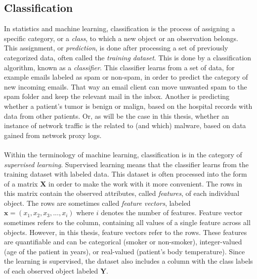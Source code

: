 \documentclass[11pt]{article}
\begin{document}
    \subsection{Classification}
      In statistics and machine learning, classification is the process of assigning a specific category, or a {\it class}, to which a new object or an observation belongs.\cite{elements} This assignment, or {\it prediction}, is done after processing a set of previously categorized data, often called the {\it training dataset}.\cite{elements} This is done by a classification algorithm, known as a {\it classifier}.\cite{elements} This classifier learns from a set of data, for example emails labeled as spam or non-spam, in order to predict the category of new incoming emails. That way an email client can move unwanted spam to the spam folder and keep the relevant mail in the inbox. Another is predicting whether a patient's tumor is benign or malign, based on the hospital records with data from other patients. Or, as will be the case in this thesis, whether an instance of network traffic is the related to (and which) malware, based on data gained from network proxy logs.
      \\~\\
      Within the terminology of machine learning, classification is in the category of {\it supervised learning}.\cite{mlintro} Supervised learning means that the classifier learns from the training dataset with labeled data. This dataset is often processed into the form of a matrix $\mathbf{X}$ in order to make the work with it more convenient. The rows in this matrix contain the observed attributes, called {\it features}, of each individual object. The rows are sometimes called {\it feature vectors}, labeled $\mathbf{x} = \left( x_1, x_2, x_3, ..., x_i \right)$ where $i$ denotes the number of features. Feature vector sometimes refers to the column, containing all values of a single feature across all objects. However, in this thesis, feature vectors refer to the rows. These features are quantifiable and can be categorical (smoker or non-smoker), integer-valued (age of the patient in years), or real-valued (patient's body temperature). Since the learning is supervised, the dataset also includes a column with the class labels of each observed object labeled $\mathbf{Y}$.
      \\~\\
\end{document}
